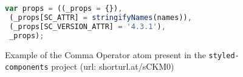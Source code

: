 \begin{figure}[htb]
  \begin{lstlisting}[language=JavaScript]
var props = ((_props = {}),
 (_props[SC_ATTR] = stringifyNames(names)),
 (_props[SC_VERSION_ATTR] = '4.3.1'),
 _props);
  \end{lstlisting}
  \caption{Example of the Comma Operator atom present in the \texttt{styled-components} project (url: shorturl.at/sCKM0)}
  \label{lst:comma-operator-sample}
\end{figure}





